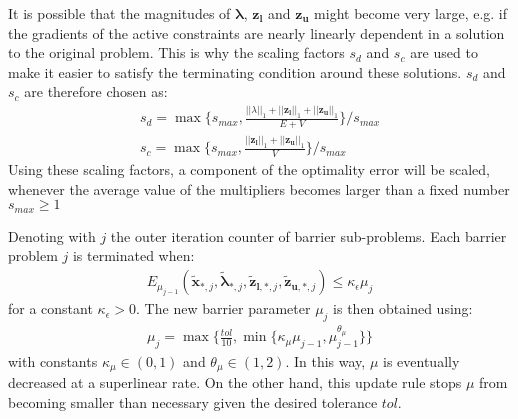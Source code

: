   It is possible that the magnitudes of $\bm{\lambda}$, $\bm{z}_{\bm{l}}$ and $\bm{z}_{\bm{u}}$ might become very large, e.g. if the gradients of the active constraints are nearly linearly dependent in a solution to the original problem. This is why the scaling factors $s_d$ and $s_c$ are used to make it easier to satisfy the terminating condition around these solutions. $s_d$ and $s_c$ are therefore chosen as:
  \begin{align}
      s_d = \max \Bigg\{ s_{max}, \frac{||\lambda||_1 + ||\bm{z}_{\bm{l}}||_1 + ||\bm{z}_{\bm{u}}||_1}{E + V} \Bigg\} / s_{max} \\
      s_c = \max \Bigg\{ s_{max}, \frac{||\bm{z}_{\bm{l}}||_1 + ||\bm{z}_{\bm{u}}||_1}{V} \Bigg\} / s_{max}
  \end{align}
  Using these scaling factors, a component of the optimality error will be scaled, whenever the average value of the multipliers becomes larger than a fixed number $s_{max} \geq 1$
  
  Denoting with $j$ the outer iteration counter of barrier sub-problems. Each barrier problem $j$ is terminated when:
  \begin{align}
      E_{\mu_{j-1}}(\tilde{\bm{x}}_{*,j}, \tilde{\bm{\lambda}}_{*,j}, \tilde{\bm{z}}_{\bm{l},*,j}, \tilde{\bm{z}}_{\bm{u},*,j}) \leq \kappa_{\epsilon} \mu_j
  \end{align}
  for a constant $\kappa_{\epsilon} > 0$. The new barrier parameter $\mu_{j}$ is then obtained using:
  \begin{align}
      \mu_j = \max \Bigg\{ \frac{tol}{10}, \min \Big\{ \kappa_{\mu} \mu_{j-1}, \mu_{j-1}^{\theta_\mu} \Big\} \Bigg\}
  \end{align}
  with constants $\kappa_{\mu} \in (0, 1)$ and $\theta_{\mu} \in (1, 2)$. In this way, $\mu$ is eventually decreased at a superlinear rate. On the other hand, this update rule stops $\mu$ from becoming smaller than necessary given the desired tolerance $tol$.
  
